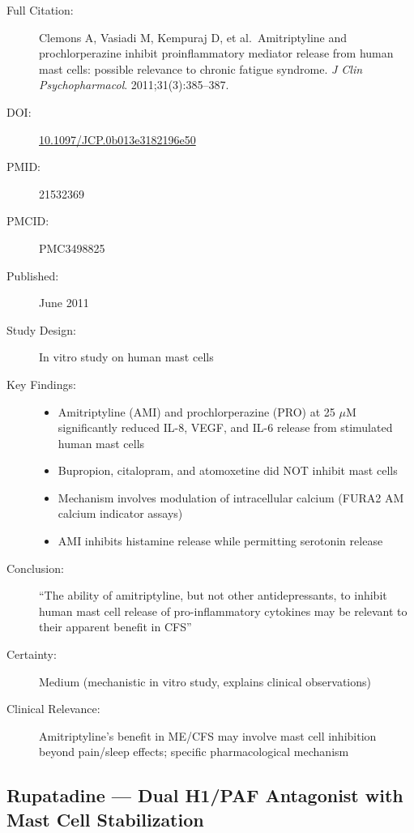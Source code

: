 \begin{description}
    \item[Full Citation:] Clemons A, Vasiadi M, Kempuraj D, et al.\ Amitriptyline and prochlorperazine inhibit proinflammatory mediator release from human mast cells: possible relevance to chronic fatigue syndrome. \textit{J Clin Psychopharmacol}. 2011;31(3):385--387.
    \item[DOI:] \href{https://doi.org/10.1097/JCP.0b013e3182196e50}{10.1097/JCP.0b013e3182196e50}
    \item[PMID:] 21532369
    \item[PMCID:] PMC3498825
    \item[Published:] June 2011
    \item[Study Design:] In vitro study on human mast cells
    \item[Key Findings:]
    \begin{itemize}
        \item Amitriptyline (AMI) and prochlorperazine (PRO) at 25 $\mu$M significantly reduced IL-8, VEGF, and IL-6 release from stimulated human mast cells
        \item Bupropion, citalopram, and atomoxetine did NOT inhibit mast cells
        \item Mechanism involves modulation of intracellular calcium (FURA2 AM calcium indicator assays)
        \item AMI inhibits histamine release while permitting serotonin release
    \end{itemize}
    \item[Conclusion:] ``The ability of amitriptyline, but not other antidepressants, to inhibit human mast cell release of pro-inflammatory cytokines may be relevant to their apparent benefit in CFS''
    \item[Certainty:] Medium (mechanistic in vitro study, explains clinical observations)
    \item[Clinical Relevance:] Amitriptyline's benefit in ME/CFS may involve mast cell inhibition beyond pain/sleep effects; specific pharmacological mechanism
\end{description}

\subsection{Rupatadine --- Dual H1/PAF Antagonist with Mast Cell Stabilization}

